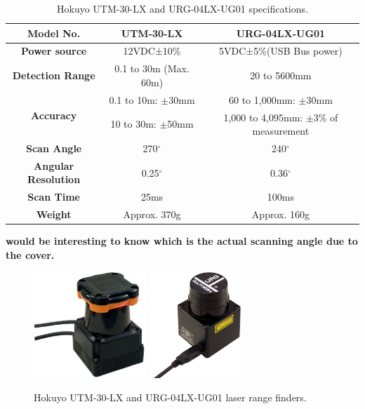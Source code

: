 \begin{table}[h]
\begin{tabular}{|c|c|c|}
\hline \bf{Model No.}& \bf{UTM-30-LX} & \bf{URG-04LX-UG01} \\
\hline \bf{Power source} & 12VDC±10\% & 5VDC±5\%(USB Bus power) \\
\hline \bf{Detection Range} & 0.1 to 30m (Max. 60m) & 20 to 5600mm \\
\hline \multirow{2}{*}{\bf{Accuracy}}
& 0.1 to 10m: $\pm$30mm  & 60 to 1,000mm: $\pm$30mm \\
& 10 to 30m: $\pm$50mm & 1,000 to 4,095mm: $\pm$3\% of measurement \\
\hline \bf{Scan Angle} & 270$^{\circ}$ & 240$^{\circ}$ \\
\hline \bf{Angular Resolution} & 0.25$^{\circ}$ & 0.36$^{\circ}$ \\
\hline \bf{Scan Time} & 25ms  & 100ms \\
\hline \bf{Weight} & Approx. 370g  & Approx. 160g \\
\hline
\end{tabular}
\caption{Hokuyo UTM-30-LX and URG-04LX-UG01 specifications.}
\end{table}

{\bf would be interesting to know which is the actual scanning angle due to the cover.}

\begin{figure}[h!]
\begin{center}
\includegraphics[height=4cm]{fig/utm30lx.jpg}
\includegraphics[height=4cm]{fig/urg04lxug01.jpg}
\end{center}
\caption{Hokuyo UTM-30-LX and URG-04LX-UG01 laser range finders.}
\label{fig:laserscans}
\end{figure}

